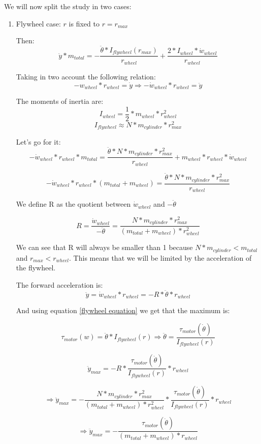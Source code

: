 We will now split the study in two cases:
\begin{enumerate}
    \item Flywheel case: $r$ is fixed to $r = r_{max}$ 
    
    Then:  
    \[\ddot{y}*m_{total} = - \frac{\ddot{\theta}*I_{flywheel}(r_{max})}{r_{wheel}} + \frac{2*I_{wheel} * \dot{w}_{wheel}}{r_{wheel}}\]

    Taking in two account the following relation:
    \[-w_{wheel} * r_{wheel} = \dot{y} \Rightarrow  -\dot{w}_{wheel} * r_{wheel} = \ddot{y} \]

    The moments of inertia are:
    \[I_{wheel} = \frac{1}{2} *m_{wheel} * r_{wheel}^2\]
    \[I_{flywheel} \approx N * m_{cylinder} * r_{max}^2\]

    Let's go for it:
    \[-\dot{w}_{wheel} * r_{wheel}*m_{total} = \frac{\ddot{\theta}* N * m_{cylinder} * r_{max}^2}{r_{wheel}} + m_{wheel} * r_{wheel} * \dot{w}_{wheel} \]

    \[-\dot{w}_{wheel} * r_{wheel}*(m_{total} + m_{wheel}) = \frac{\ddot{\theta}*N * m_{cylinder} * r_{max}^2}{r_{wheel}}\]


    We define R as the quotient between $\dot{w}_{wheel}$ and $-\ddot{\theta}$

    \[R = \frac{\dot{w}_{wheel}}{-\ddot{\theta}} = \frac{N * m_{cylinder} * r_{max}^2}{(m_{total} + m_{wheel}) * r_{wheel}^2} \]

    We can see that R will always be smaller than 1 because $N * m_{cylinder} < m_{total} $ and $r_{max} < r_{wheel}$. This means that we will be limited by the acceleration of the flywheel.

    The forward acceleration is:
    \[\ddot{y} = \dot{w}_{wheel} * r_{wheel} = - R * \ddot{\theta} * r_{wheel}\]

    And using equation \ref{flywheel equation} we get that the maximum is:

    \[\tau_{motor} (w) = \ddot{\theta}*I_{flywheel}(r) \Rightarrow \ddot{\theta} = \frac{\tau_{motor} (\dot{\theta})}{I_{flywheel}(r)} \]

    \[\ddot{y}_{max} = - R * \frac{\tau_{motor} (\dot{\theta})}{I_{flywheel}(r)} * r_{wheel}\]

    \[\Rightarrow \ddot{y}_{max} = -\frac{N * m_{cylinder} * r_{max}^2}{(m_{total} + m_{wheel}) * r_{wheel}^2} * \frac{\tau_{motor} (\dot{\theta})}{I_{flywheel}(r)} * r_{wheel}\]
    
    \[\boxed{\Rightarrow \ddot{y}_{max} = -\frac{\tau_{motor} (\dot{\theta})}{(m_{total} +m_{wheel}) * r_{wheel}}} \]
    

\end{enumerate}
